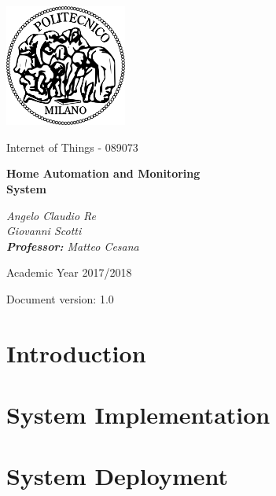\documentclass[a4paper,12pt]{report}
\begin{document}
\begin{titlepage}
\centering
\includegraphics[width=0.30\textwidth]{./pictures/logo_poli}\par
	\vspace{1.8cm}
	{\Large {Internet of Things - 089073} \par}
	\vspace{1.2cm}
	{\LARGE \textbf{Home Automation and Monitoring \\
		System} \par}
	\vspace{2.5cm}
	\begin{flushright}
		{\Large\itshape{Angelo Claudio Re \\ Giovanni Scotti \\}
		\vspace{0.5cm} 
		\Large{\textbf{Professor:} Matteo Cesana}
	    \par}
	\end{flushright}
	\vspace{2cm}
	\vfill
	{\large Academic Year 2017/2018 \par}
	\vspace{0.3cm}
	{\large Document version: 1.0\par}
\end{titlepage}

\tableofcontents

\newpage
{}

\chapter{Introduction}
\label{ch:Introduction}


\chapter{System Implementation}
\label{ch:System Implementation}


\chapter{System Deployment}
\label{ch:System Deployment}

\end{document}
